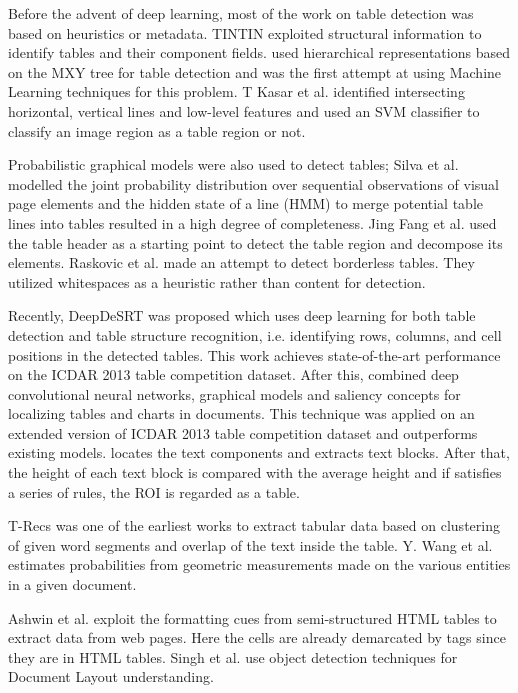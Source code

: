 \documentclass[conference]{IEEEtran}
\begin{document}
Before the advent of deep learning, most of the work on table detection was based on heuristics or metadata. TINTIN \cite{pyreddy1997tintin} exploited structural information to identify tables and their component fields. \cite{cesarini2002trainable} used hierarchical representations based on the MXY tree for table detection and was the first attempt at using Machine Learning techniques for this problem.
T Kasar et al. \cite{kasar2013learning} identified intersecting horizontal, vertical lines and low-level features and used an SVM classifier to classify an image region as a table region or not.

Probabilistic graphical models were also used to detect tables; Silva et al. \cite{e2009learning} modelled the joint probability distribution over sequential
observations of visual page elements and the hidden state of a line (HMM) to merge potential table lines into tables resulted in a high degree of completeness. Jing Fang et al. \cite{fang2012table} used the table header as a starting point to detect the table region and decompose its elements. Raskovic et al. \cite{raskovic2018borderless} made an attempt to detect borderless tables. They utilized whitespaces as a heuristic rather than content for detection.

Recently, DeepDeSRT \cite{schreiber} was proposed which uses deep learning for both table detection and table structure recognition, i.e. identifying rows, columns, and cell positions in the detected tables. This work achieves state-of-the-art performance on the ICDAR 2013 table competition dataset. After this, \cite{kavasidis2018saliency} combined deep convolutional neural networks, graphical models and saliency concepts for localizing tables and charts in documents. This technique was applied on an extended version of ICDAR 2013 table competition dataset and outperforms existing models. \cite{tran2015table} locates the text components and extracts text blocks. After that, the height of each text block is compared with the average height and if satisfies a series of rules, the ROI is regarded as a table.

T-Recs \cite{kieninger1998t} was one of the earliest works to extract tabular data based on clustering of given word segments and overlap of the text inside the table. Y. Wang et al. \cite{wang2004table} estimates probabilities from geometric measurements made on the various entities in a given document.

Ashwin et al. \cite{tengli2004learning} exploit the formatting cues from semi-structured HTML tables to extract data from web pages. Here the cells are already demarcated by tags since they are in HTML tables. Singh et al. \cite{singh2018multidomain} use object detection techniques for Document Layout understanding.
\end{document}
